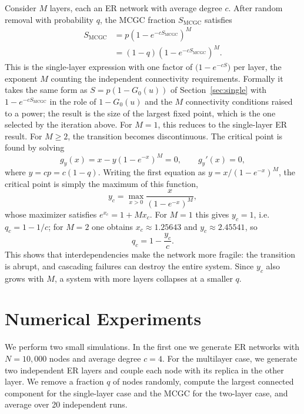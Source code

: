 \documentclass[11pt]{article}
\begin{document}
Consider $M$ layers, each an ER network with average degree $c$. After random removal with probability $q$, the MCGC fraction $S_{\mathrm{MCGC}}$ satisfies
\begin{equation}
\begin{aligned}
  S_{\mathrm{MCGC}} &= p(1-e^{-cS_{\mathrm{MCGC}}})^M\\
  &= (1-q)(1-e^{-cS_{\mathrm{MCGC}}})^M.
\end{aligned}
\end{equation}
This is the single-layer expression with one factor of $\bigl(1-e^{-cS}\bigr)$ per layer, the exponent $M$ counting the independent connectivity requirements. Formally it takes the same form as $S=p(1-G_0(u))$ of Section~\ref{sec:single} with $1-e^{-cS_{\mathrm{MCGC}}}$ in the role of $1-G_0(u)$ and the $M$ connectivity conditions raised to a power; the result is the size of the largest fixed point, which is the one selected by the iteration above. For $M=1$, this reduces to the single-layer ER result. For $M\ge 2$, the transition becomes discontinuous. The critical point is found by solving
\begin{equation}
  g_y(x)=x-y(1-e^{-x})^M=0,
  \qquad
  g_y'(x)=0,
\end{equation}
where $y=cp=c(1-q)$. Writing the first equation as $y=x/(1-e^{-x})^M$, the critical point is simply the maximum of this function,
\begin{equation}
  y_c = \max_{x>0} \frac{x}{(1-e^{-x})^M},
\end{equation}
whose maximizer satisfies $e^{x_c}=1+Mx_c$. For $M=1$ this gives $y_c=1$, i.e.\ $q_c=1-1/c$; for $M=2$ one obtains $x_c\approx 1.25643$ and $y_c\approx 2.45541$, so
\begin{equation}
  q_c = 1-\frac{y_c}{c}.
\end{equation}
This shows that interdependencies make the network more fragile: the transition is abrupt, and cascading failures can destroy the entire system. Since $y_c$ also grows with $M$, a system with more layers collapses at a smaller $q$.

\section{Numerical Experiments}
We perform two small simulations. In the first one we generate ER networks with $N=10{,}000$ nodes and average degree $c=4$. For the multilayer case, we generate two independent ER layers and couple each node with its replica in the other layer. We remove a fraction $q$ of nodes randomly, compute the largest connected component for the single-layer case and the MCGC for the two-layer case, and average over 20 independent runs.
\end{document}
